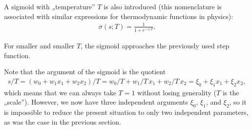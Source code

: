\documentclass[a4paper,12pt,polish]{jupyterBook}
\begin{document}
\sphinxAtStartPar
A sigmoid with „temperature” \( T \) is also introduced (this nomenclature is associated with similar expressions for thermodynamic functions in physics):
\begin{equation*}
\begin{split}\sigma(s;T)=\frac{1}{1+e^{-s/T}}.\end{split}
\end{equation*}\begin{sphinxVerbatimInput}

\begin{sphinxVerbatim}[commandchars=\\\{\}]
 
     
\end{sphinxVerbatim}
\end{sphinxVerbatimInput}
\begin{sphinxVerbatimOutput}

\noindent{}
\end{sphinxVerbatimOutput}

\sphinxAtStartPar
For smaller and smaller \(T\), the sigmoid approaches the previously used step function.

\sphinxAtStartPar
Note that the argument of the sigmoid is the quotient
\begin{equation*}
\begin{split}
s/T = (w_0 + w_1 x_1 + w_2 x_2) / T = w_0 / T + w_1 / T \, x_1 + w_2 / T \, x_2 = \xi_0 + \xi_1 x_1 + \xi_2 x_2,
\end{split}
\end{equation*}
\sphinxAtStartPar
which means that we can always take \( T = 1 \) without losing generality (\( T \) is the „scale”). However, we now have three independent arguments \( \xi_0 \), \( \xi_1 \), and \( \xi_2\), so it is impossible to reduce the present situation to only two independent parameters, as was the case in the previous section.
\end{document}
